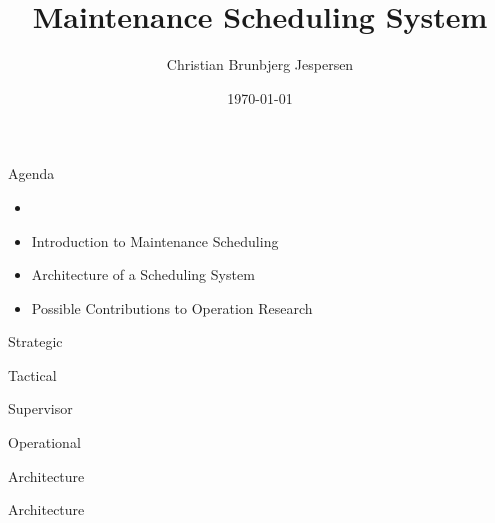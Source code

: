 \documentclass{beamer}
\title{Maintenance Scheduling System}
\author{Christian Brunbjerg Jespersen}
\institute{Technical University of Denmark}
\date{\today}
\begin{document}






\frame{\titlepage}

\begin{frame}{Agenda}
    \begin{itemize}
		\item
        \item Introduction to Maintenance Scheduling
        \item Architecture of a Scheduling System
        \item Possible Contributions to Operation Research
    \end{itemize}
\end{frame}

\begin{frame}[t]{Strategic}
\end{frame}

\begin{frame}[t]{Tactical}
\end{frame}

\begin{frame}[t]{Supervisor}
\end{frame}

\begin{frame}[t]{Operational}
\end{frame}

\begin{frame}[t]{Architecture}
	\drawGraph{}
\end{frame}

\begin{frame}[t]{Architecture}
\end{frame}
\end{document}
